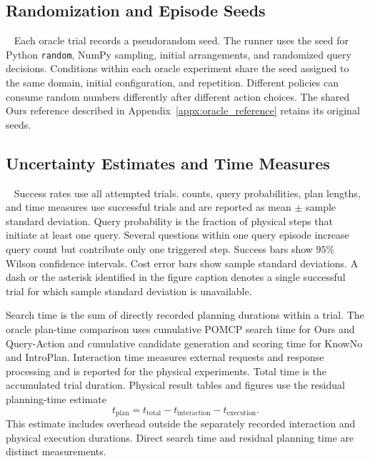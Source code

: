 \subsection{Randomization and Episode Seeds}~\label{appx:randomization}
Each oracle trial records a pseudorandom seed. The runner uses the seed for Python \texttt{random}, NumPy sampling, initial arrangements, and randomized query decisions. Conditions within each oracle experiment share the seed assigned to the same domain, initial configuration, and repetition. Different policies can consume random numbers differently after different action choices. The shared Ours reference described in Appendix~\ref{appx:oracle_reference} retains its original seeds.

\subsection{Uncertainty Estimates and Time Measures}~\label{appx:metric_details}
Success rates use all attempted trials.  counts, query probabilities, plan lengths, and time measures use successful trials and are reported as mean $\pm$ sample standard deviation. Query probability is the fraction of physical steps that initiate at least one query. Several questions within one query episode increase query count but contribute only one triggered step. Success bars show $95\%$ Wilson confidence intervals. Cost error bars show sample standard deviations. A dash or the asterisk identified in the figure caption denotes a single successful trial for which sample standard deviation is unavailable.

Search time is the sum of directly recorded planning durations within a trial. The oracle plan-time comparison uses cumulative POMCP search time for Ours and Query-Action and cumulative candidate generation and scoring time for KnowNo and IntroPlan. Interaction time measures external requests and response processing and is reported for the physical experiments. Total time is the accumulated trial duration. Physical result tables and figures use the residual planning-time estimate
\[
t_{\mathrm{plan}}=t_{\mathrm{total}}-t_{\mathrm{interaction}}-t_{\mathrm{execution}}.
\]
This estimate includes overhead outside the separately recorded interaction and physical execution durations. Direct search time and residual planning time are distinct measurements.


